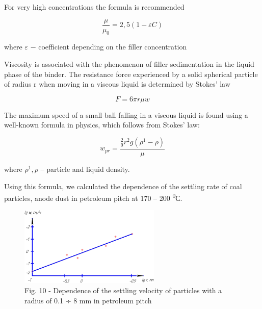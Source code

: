 \begin{multicols}{2}
For very high concentrations the formula is recommended

\[\frac{\mu}{\mu_{0}} = 2,5(1 - \varepsilon C)\]

where \(\varepsilon\) − coefficient depending on the filler
concentration

Viscosity is associated with the phenomenon of filler sedimentation in
the liquid phase of the binder. The resistance force experienced by a
solid spherical particle of radius r when moving in a viscous liquid is
determined by Stokes'{} law

\[F = 6\pi r\mu w\]

The maximum speed of a small ball falling in a viscous liquid is found
using a well-known formula in physics, which follows from
Stokes'{} law:

\[w_{pr} = \frac{\frac{2}{9}r^{2}g\left( \rho^{1} - \rho \right)}{\mu}\]

where \(\rho^{1},\rho\) -- particle and liquid density.

Using this formula, we calculated the dependence of the settling rate of
coal particles, anode dust in petroleum pitch at 170 -- 200
\textsuperscript{0}С.
\end{multicols}

\begin{figure}[H]
	\centering
	\includegraphics[width=0.6\textwidth]{media/gorn2/image13}
	\caption*{Fig. 10 - Dependence of the settling velocity of particles with a radius of 0.1 ÷ 8 mm in petroleum pitch}
\end{figure}

